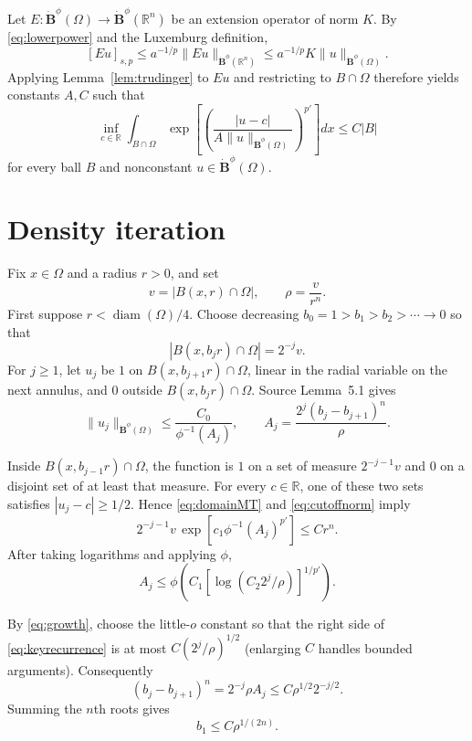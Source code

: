\documentclass[11pt]{article}
\newcommand{\R}{\mathbb R}
\newcommand{\Bphi}{\dot{\mathbf B}^{\phi}}
\newcommand{\norm}[1]{\lVert#1\rVert}
\begin{document}
Let $E:\Bphi(\Omega)\to\Bphi(\R^n)$ be an extension operator of norm $K$.
By \eqref{eq:lowerpower} and the Luxemburg definition,
\begin{equation}\label{eq:powercontrol}
 [Eu]_{s,p}\leq a^{-1/p}\norm{Eu}_{\Bphi(\R^n)}
 \leq a^{-1/p}K\norm{u}_{\Bphi(\Omega)}.
\end{equation}
Applying Lemma~\ref{lem:trudinger} to $Eu$ and restricting to $B\cap\Omega$
therefore yields constants $A,C$ such that
\begin{equation}\label{eq:domainMT}
 \inf_{c\in\R}\int_{B\cap\Omega}
 \exp\left[\left(
 \frac{|u-c|}{A\norm{u}_{\Bphi(\Omega)}}
 \right)^{p'}\right]dx\leq C|B|
\end{equation}
for every ball $B$ and nonconstant $u\in\Bphi(\Omega)$.

\section*{Density iteration}

Fix $x\in\Omega$ and a radius $r>0$, and set
\[
 v=|B(x,r)\cap\Omega|,\qquad \rho=\frac{v}{r^n}.
\]
First suppose $r<\operatorname{diam}(\Omega)/4$.  Choose decreasing
$b_0=1>b_1>b_2>\cdots\to0$ so that
\begin{equation}\label{eq:halving}
 |B(x,b_jr)\cap\Omega|=2^{-j}v.
\end{equation}
For $j\geq1$, let $u_j$ be $1$ on $B(x,b_{j+1}r)\cap\Omega$, linear in the
radial variable on the next annulus, and $0$ outside
$B(x,b_jr)\cap\Omega$.  Source Lemma~5.1 gives
\begin{equation}\label{eq:cutoffnorm}
 \norm{u_j}_{\Bphi(\Omega)}
 \leq \frac{C_0}{\phi^{-1}(A_j)},\qquad
 A_j=\frac{2^j(b_j-b_{j+1})^n}{\rho}.
\end{equation}

Inside $B(x,b_{j-1}r)\cap\Omega$, the function is $1$ on a set of measure
$2^{-j-1}v$ and $0$ on a disjoint set of at least that measure.  For every
$c\in\R$, one of these two sets satisfies $|u_j-c|\geq1/2$.  Hence
\eqref{eq:domainMT} and \eqref{eq:cutoffnorm} imply
\[
 2^{-j-1}v\,
 \exp\left[c_1\phi^{-1}(A_j)^{p'}\right]\leq Cr^n.
\]
After taking logarithms and applying $\phi$,
\begin{equation}\label{eq:keyrecurrence}
 A_j\leq
 \phi\left(C_1[\log(C_2 2^j/\rho)]^{1/p'}\right).
\end{equation}

By \eqref{eq:growth}, choose the little-$o$ constant so that the right side
of \eqref{eq:keyrecurrence} is at most
$C(2^j/\rho)^{1/2}$ (enlarging $C$ handles bounded arguments).  Consequently
\[
 (b_j-b_{j+1})^n
 =2^{-j}\rho A_j
 \leq C\rho^{1/2}2^{-j/2}.
\]
Summing the $n$th roots gives
\begin{equation}\label{eq:b1}
 b_1\leq C\rho^{1/(2n)}.
\end{equation}
\end{document}
